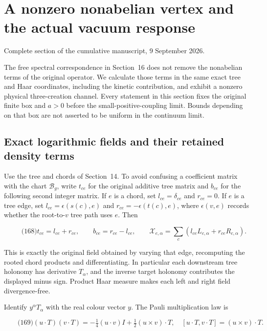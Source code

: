 \section{A nonzero nonabelian vertex and the actual vacuum
response}\label{nonabelian-vertex-md-a-nonzero-nonabelian-vertex-and-the-actual-vacuum-response}

Complete section of the cumulative manuscript, 9 September 2026.

The free spectral correspondence in Section~16 does not remove the
nonabelian terms of the original operator. We calculate those terms in
the same exact tree and Haar coordinates, including the kinetic
contribution, and exhibit a nonzero physical three-creation channel.
Every statement in this section fixes the original finite box and
\(a>0\) before the small-positive-coupling limit. Bounds depending on
that box are not asserted to be uniform in the continuum limit.

\subsection{Exact logarithmic fields and their retained density
terms}\label{nonabelian-vertex-md-exact-logarithmic-fields-and-their-retained-density-terms}

Use the tree and chords of Section~14. To avoid confusing a coefficient
matrix with the chart \(\mathcal B_g\), write \(t_{ce}\) for the
original additive tree matrix and \(b_{ce}\) for the following second
integer matrix. If \(e\) is a chord, set \(l_{ce}=\delta_{ce}\) and
\(r_{ce}=0\). If \(e\) is a tree edge, set \(l_{ce}=\epsilon(s(c),e)\)
and \(r_{ce}=-\epsilon(t(c),e)\), where \(\epsilon(v,e)\) records
whether the root-to-\(v\) tree path uses \(e\). Then

\[
\qquad\text{(168)}
 t_{ce}=l_{ce}+r_{ce},\qquad b_{ce}=r_{ce}-l_{ce},\qquad
 \mathcal X_{e,\alpha}=
       \sum_c(l_{ce}L_{c,\alpha}+r_{ce}R_{c,\alpha}).
\]

This is exactly the original field obtained by varying that edge,
recomputing the rooted chord products and differentiating. In particular
each downstream tree holonomy has derivative \(T_\alpha\), and the
inverse target holonomy contributes the displayed minus sign. Product
Haar measure makes each left and right field divergence-free.

Identify \(y^\alpha T_\alpha\) with the real colour vector \(y\). The
Pauli multiplication law is

\[
\qquad\text{(169)}
 (u\cdot T)(v\cdot T)
       =-\tfrac14(u\cdot v)I+\tfrac12(u\times v)\cdot T,
 \quad [u\cdot T,v\cdot T]=(u\times v)\cdot T.
\]

